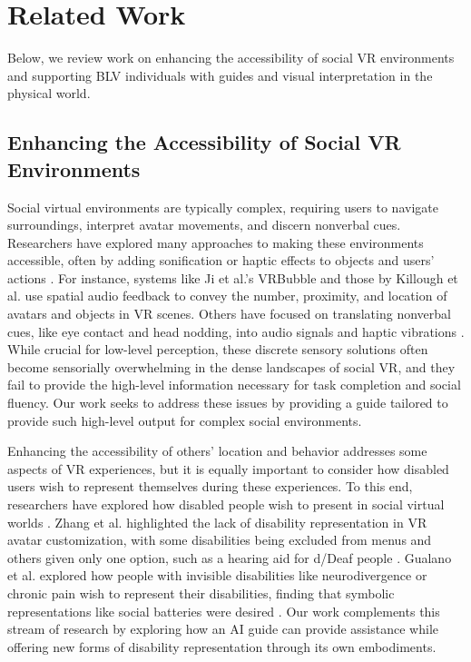 \section{Related Work}

Below, we review work on enhancing the accessibility of social VR environments and supporting BLV individuals with guides and visual interpretation in the physical world.

\subsection{Enhancing the Accessibility of Social VR Environments}

Social virtual environments are typically complex, requiring users to navigate surroundings, interpret avatar movements, and discern nonverbal cues. Researchers have explored many approaches to making these environments accessible, often by adding sonification or haptic effects to objects and users’ actions \cite{ji2022vrbubble, balasubramanian2023sceneweaver, jain2015hmd, goncalves2023navaware, killough2025vrsight, killough2025vrsightdemo}. For instance, systems like Ji et al.’s VRBubble \cite{ji2022vrbubble} and those by Killough et al. \cite{killough2025vrsight, killough2025vrsightdemo} use spatial audio feedback to convey the number, proximity, and location of avatars and objects in VR scenes. Others have focused on translating nonverbal cues, like eye contact and head nodding, into audio signals and haptic vibrations \cite{wieland2022nvc, wieland2023gaze, segal2024socialcues, dang2023music, collins2023gaze, jung2024accessible}. While crucial for low-level perception, these discrete sensory solutions often become sensorially overwhelming in the dense landscapes of social VR, and they fail to provide the high-level information necessary for task completion and social fluency. Our work seeks to address these issues by providing a guide tailored to provide such high-level output for complex social environments.

Enhancing the accessibility of others’ location and behavior addresses some aspects of VR experiences, but it is equally important to consider how disabled users wish to represent themselves during these experiences. To this end, researchers have explored how disabled people wish to present in social virtual worlds \cite{gualano2023invisible, gualano2024looking, zhang2023signifier, zhang2022selfpres, mack2023avatarrep}. Zhang et al. highlighted the lack of disability representation in VR avatar customization, with some disabilities being excluded from menus and others given only one option, such as a hearing aid for d/Deaf people \cite{zhang2022selfpres}. Gualano et al. explored how people with invisible disabilities like neurodivergence or chronic pain wish to represent their disabilities, finding that symbolic representations like social batteries were desired \cite{gualano2023invisible}. Our work complements this stream of research by exploring how an AI guide can provide assistance while offering new forms of disability representation through its own embodiments.

